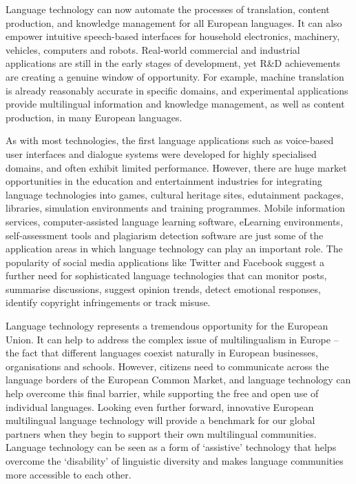 \documentclass[]{../../metanetpaper}
\begin{document}
\begin{Parallel}[c]{79mm}{78mm}
{Language technology can now automate the processes of translation, content production, and knowledge management for all European languages. It can also empower intuitive speech-based interfaces for household electronics, machinery, vehicles, computers and robots. Real-world commercial and industrial applications are still in the early stages of development, yet R\&D achievements are creating a genuine window of opportunity. For example, machine translation is already reasonably accurate in specific domains, and experimental applications provide multilingual information and knowledge management, as well as content production, in many European languages. 

As with most technologies, the first language applications such as voice-based user interfaces and dialogue systems were developed for highly specialised domains, and often exhibit limited performance. However, there are huge market opportunities in the education and entertainment industries for integrating language technologies into games, cultural heritage sites, edutainment packages, libraries, simulation environments and training programmes. Mobile information services, computer-assisted language learning software, eLearning environments, self-assessment tools and plagiarism detection software are just some of the application areas in which language technology can play an important role. The popularity of social media applications like Twitter and Facebook suggest a further need for sophisticated language technologies that can monitor posts, summarise discussions, suggest opinion trends, detect emotional responses, identify copyright infringements or track misuse.

Language technology represents a tremendous opportunity for the European Union. It can help to address the complex issue of multilingualism in Europe – the fact that different languages coexist naturally in European businesses, organisations and schools. However, citizens need to communicate across the language borders of the European Common Market, and language technology can help overcome this final barrier, while supporting the free and open use of individual languages. Looking even further forward, innovative European multilingual language technology will provide a benchmark for our global partners when they begin to support their own multilingual communities. Language technology can be seen as a form of ‘assistive’ technology that helps overcome the ‘disability’ of linguistic diversity and makes language communities more accessible to each other.

}
\end{Parallel}
\end{document}
